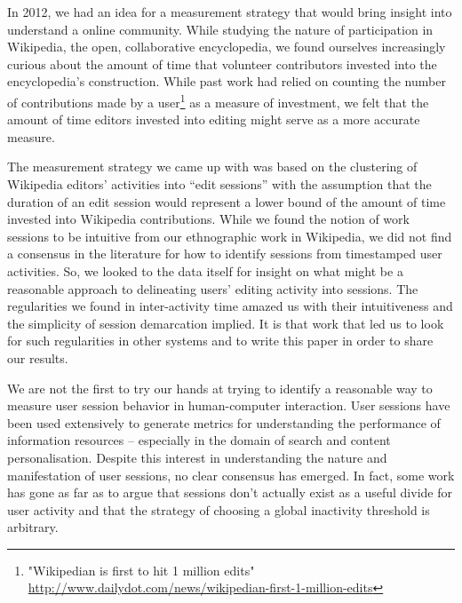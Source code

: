 In 2012, we had an idea for a measurement strategy that would bring insight into understand a online community.  While studying the nature of participation in Wikipedia, the open, collaborative encyclopedia, we found ourselves increasingly curious about the amount of time that volunteer contributors invested into the encyclopedia's construction.  While past work had relied on counting the number of contributions made by a user\footnote{"Wikipedian is first to hit 1 million edits" \url{http://www.dailydot.com/news/wikipedian-first-1-million-edits}} as a measure of investment, we felt that the amount of time editors invested into editing might serve as a more accurate measure.

The measurement strategy we came up with was based on the clustering of Wikipedia editors' activities into ``edit sessions'' with the assumption that the duration of an edit session would represent a lower bound of the amount of time invested into Wikipedia contributions\cite{geiger2013using}.  While we found the notion of work sessions to be intuitive from our ethnographic work in Wikipedia, we did not find a consensus in the literature for how to identify sessions from timestamped user activities.  So, we looked to the data itself for insight on what might be a reasonable approach to delineating users' editing activity into sessions. The regularities we found in inter-activity time amazed us with their intuitiveness and the simplicity of session demarcation implied. It is that work that led us to look for such regularities in other systems and to write this paper in order to share our results.

We are not the first to try our hands at trying to identify a reasonable way to measure user session behavior in human-computer interaction.  User sessions have been used extensively to generate metrics for understanding the performance of information resources\cite{govseva2006empirical} -- especially in the domain of search\cite{donato2010you}\cite{eickhoff2014lessons} and content personalisation\cite{spiliopoulou2003framework,gomory1999analysis}. Despite this interest in understanding the nature and manifestation of user sessions, no clear consensus has emerged.  In fact, some work has gone as far as to argue that sessions don't actually exist as a useful divide for user activity\cite{jones2008beyond} and that the strategy of choosing a global inactivity threshold is arbitrary\cite{montgomery2001identifying}.

